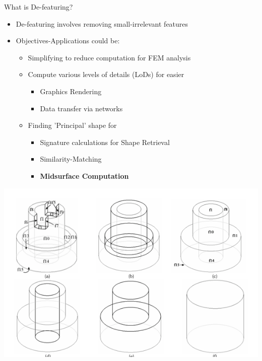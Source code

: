 \begin{frame}{What is De-featuring?}
\begin{itemize}[noitemsep,label=\textbullet,topsep=2pt,parsep=2pt,partopsep=2pt]
\item De-featuring involves removing small-irrelevant features
\item Objectives-Applications could be:
	\begin{itemize}[noitemsep,label=\textbullet,topsep=2pt,parsep=2pt,partopsep=2pt]
	\item Simplifying to reduce computation for FEM analysis
	\item Compute various levels of details (LoDs) for easier
		\begin{itemize}[noitemsep,label=\textbullet,topsep=2pt,parsep=2pt,partopsep=2pt]
		\item Graphics Rendering
		\item Data transfer via networks
		\end{itemize}
	\item Finding 'Principal' shape for
		\begin{itemize}[noitemsep,label=\textbullet,topsep=2pt,parsep=2pt,partopsep=2pt]
		\item Signature calculations for Shape Retrieval
		\item Similarity-Matching
		\item \textbf{Midsurface Computation}
		\end{itemize}
	\end{itemize}
\end{itemize}


\centering
		\includegraphics[width=0.25\linewidth]{..//Common/images/DefeaturingLoDs.png}


\end{frame}

